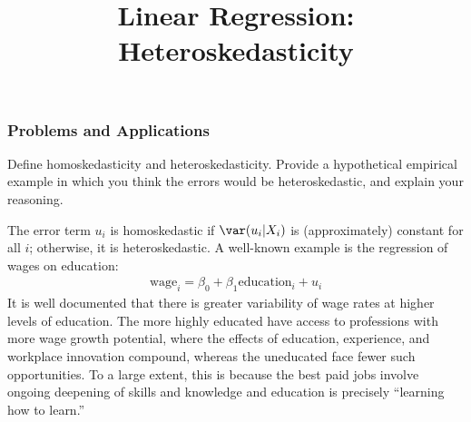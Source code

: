 \title[Weight]{Linear Regression: Heteroskedasticity}
\date{}







\begin{frame}
\frametitle{Problems and Applications}

Define homoskedasticity and heteroskedasticity. Provide a hypothetical empirical example in which you think the errors would be heteroskedastic, and explain your reasoning.

\begin{answer}
The error term $u_{i}$ is homoskedastic if $\var(u_{i}|X_{i})$ is (approximately) constant for all $i$; otherwise, it is heteroskedastic. A well-known example is the regression of wages on education:
\begin{align*}
\text{wage}_{i} = \beta_{0} + \beta_{1} \text{education}_{i} + u_{i}
\end{align*}
It is well documented that there is greater variability of wage rates at higher levels of education. The more highly educated have access to professions with more wage growth potential, where the effects of education, experience, and workplace innovation compound, whereas the uneducated face fewer such opportunities. To a large extent, this is because the best paid jobs involve ongoing deepening of skills and knowledge and education is precisely ``learning how to learn.''
\end{answer}

\end{frame}



